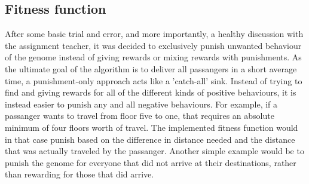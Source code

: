 \subsection{Fitness function}

    After some basic trial and error, and more importantly, a healthy discussion with the assignment teacher, it was decided to exclusively punish unwanted behaviour of the genome instead of giving rewards or mixing rewards with punishments. As the ultimate goal of the algorithm is to deliver all passangers in a short average time, a punishment-only approach acts like a 'catch-all' sink. Instead of trying to find and giving rewards for all of the different kinds of positive behaviours, it is instead easier to punish any and all negative behaviours. For example, if a passanger wants to travel from floor five to one, that requires an absolute minimum of four floors worth of travel. The implemented fitness function would in that case punish based on the difference in distance needed and the distance that was actually traveled by the passanger. Another simple example would be to punish the genome for everyone that did not arrive at their destinations, rather than rewarding for those that did arrive.






